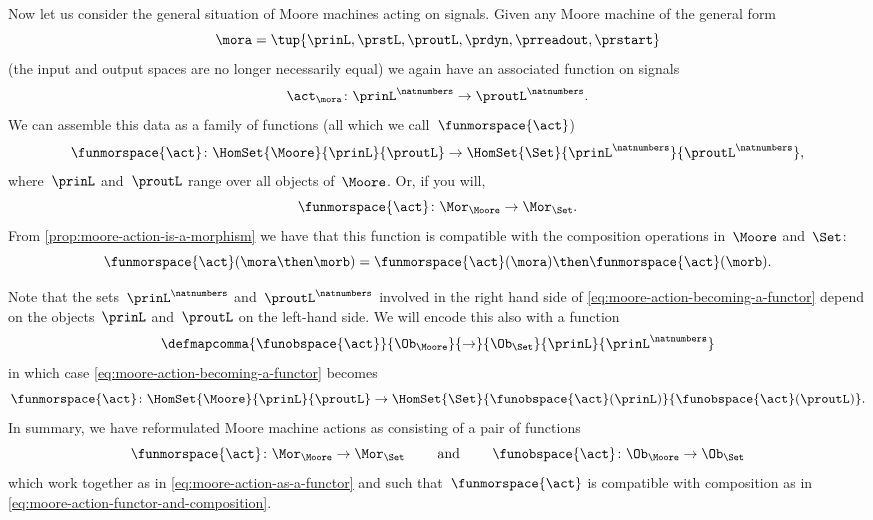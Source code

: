 Now let us consider the general situation of Moore machines acting on signals.
Given any Moore machine of the general form
\begin{equation*}
    \mora = \tup{\prinL,\prstL,\proutL,\prdyn,\prreadout,\prstart}
\end{equation*}
(the input and output spaces are no longer necessarily equal) we again have an associated function on signals
\begin{equation*}
    \act_{\mora} \colon {\prinL}^\natnumbers \to {\proutL}^\natnumbers.
\end{equation*}
We can assemble this data as a family of functions (all which we call~$\funmorspace{\act}$)
\begin{equation}
    \label{eq:moore-action-becoming-a-functor}
    \funmorspace{\act} \colon  \HomSet{\Moore}{\prinL}{\proutL} \to \HomSet{\Set}{\prinL^{\natnumbers}}{\proutL^{\natnumbers}},
\end{equation}
where~$\prinL$ and~$\proutL$ range over all objects of~$\Moore$.
Or, if you will,
\begin{equation*}
    \funmorspace{\act} \colon \Mor_\Moore \to \Mor_\Set.
\end{equation*}
From \cref{prop:moore-action-is-a-morphism} we have that this function is compatible with the composition operations in~$\Moore$ and~$\Set$:
\begin{equation}
    \label{eq:moore-action-functor-and-composition}
    \funmorspace{\act}(\mora \then \morb) = \funmorspace{\act}(\mora) \then \funmorspace{\act}(\morb).
\end{equation}

Note that the sets~$\prinL^{\natnumbers}$ and~$\proutL^{\natnumbers}$ involved in the right hand side of \cref{eq:moore-action-becoming-a-functor} depend on the objects~$\prinL$ and~$\proutL$ on the left-hand side.
We will encode this also with a function
\begin{equation*}
    \defmapcomma{\funobspace{\act}}
    {\Ob_{\Moore}}
    {\to}
    {\Ob_{\Set}}
    {\prinL}
    {\prinL^\natnumbers}
\end{equation*}
in which case \cref{eq:moore-action-becoming-a-functor} becomes
\begin{equation}
    \label{eq:moore-action-as-a-functor}
    \funmorspace{\act} \colon  \HomSet{\Moore}{\prinL}{\proutL} \to \HomSet{\Set}{ \funobspace{\act}(\prinL)}{\funobspace{\act}(\proutL)}.
\end{equation}
%
In summary, we have reformulated Moore machine actions as consisting of a pair of functions
\begin{equation}
    \funmorspace{\act} \colon \Mor_\Moore \to \Mor_\Set \qquad \text{ and } \qquad \funobspace{\act} \colon \Ob_{\Moore} \to \Ob_{\Set}
\end{equation}
which work together as in \cref{eq:moore-action-as-a-functor} and such that~$\funmorspace{\act}$ is compatible with composition as in \cref{eq:moore-action-functor-and-composition}.

